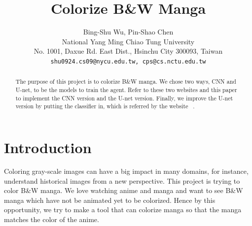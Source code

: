 \documentclass[10pt,twocolumn,letterpaper]{article}
\begin{document}
\title{Colorize B\&W Manga}

\author{Bing-Shu Wu,  Pin-Shao Chen\\
National Yang Ming Chiao Tung University \\
No. 1001, Daxue Rd. East Dist., Hsinchu City 300093, Taiwan\\
{\tt\small shu0924.cs09@nycu.edu.tw, cps@cs.nctu.edu.tw}
}
\maketitle

\begin{abstract}
The purpose of this project is to colorize B\&W manga. We chose two ways, CNN and U-net, to be the models to train the agent. Refer to these two websites and this paper~\cite{CNN,U-net,Unet} to implement the CNN version and the U-net version. Finally, we improve the U-net version by putting the classifier in, which is referred by the website ~\cite{CNN}.
\end{abstract}


\section{Introduction}
Coloring gray-scale images can have a big impact in many domains, for instance, understand historical images from a new perspective. This project is trying to color B\&W manga. We love watching anime and manga and want to see B\&W manga which have not be animated yet to be colorized. Hence by this opportunity, we try to make a tool that can colorize manga so that the manga matches the color of the anime.
\end{document}
